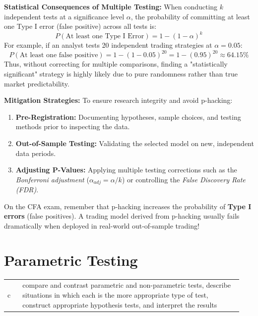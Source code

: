 \textbf{Statistical Consequences of Multiple Testing:} When conducting $k$ independent tests at a significance level $\alpha$, the probability of committing at least one Type I error (false positive) across all tests is:
\begin{equation}
	P(\text{At least one Type I Error}) = 1 - (1 - \alpha)^k
	\label{eq:p_hacking_type_1_m7}
\end{equation}
For example, if an analyst tests 20 independent trading strategies at $\alpha = 0.05$:
$$P(\text{At least one false positive}) = 1 - (1 - 0.05)^{20} = 1 - (0.95)^{20} \approx 64.15\%$$
Thus, without correcting for multiple comparisons, finding a "statistically significant" strategy is highly likely due to pure randomness rather than true market predictability.

\textbf{Mitigation Strategies:} To ensure research integrity and avoid p-hacking:
\begin{enumerate}
	\item \textbf{Pre-Registration:} Documenting hypotheses, sample choices, and testing methods prior to inspecting the data.
	\item \textbf{Out-of-Sample Testing:} Validating the selected model on new, independent data periods.
	\item \textbf{Adjusting P-Values:} Applying multiple testing corrections such as the \textit{Bonferroni adjustment} ($\alpha_{adj} = \alpha/k$) or controlling the \textit{False Discovery Rate (FDR)}.
\end{enumerate}

\begin{examtip}[title=Exam Tip: P-Hacking in CFA Exam]
On the CFA exam, remember that p-hacking increases the probability of \textbf{Type I errors} (false positives). A trading model derived from p-hacking usually fails dramatically when deployed in real-world out-of-sample trading!
\end{examtip}

\section{Parametric Testing}
\label{sec:Parametric Testing}

\begin{center}
\begin{tabular}{p{0.06\linewidth} | p{0.88\linewidth}}
	c & compare and contrast parametric and non-parametric tests, describe situations in which each is the more appropriate type of test, construct appropriate hypothesis tests, and interpret the results \\
\end{tabular}
\end{center}

